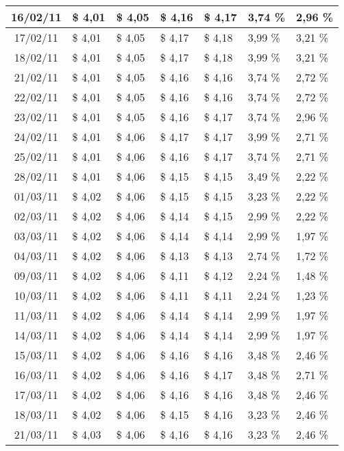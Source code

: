 \begin{center}
\begin{longtable}{|c|p{1.5cm}|p{1.5cm}|p{1.5cm}|p{1.5cm}|p{1.5cm}|p{1.5cm}|}
16/02/11 & \$ 4,01 & \$ 4,05 & \$ 4,16 & \$ 4,17 & 3,74 \% & 2,96 \% \\ \hline
17/02/11 & \$ 4,01 & \$ 4,05 & \$ 4,17 & \$ 4,18 & 3,99 \% & 3,21 \% \\ \hline
18/02/11 & \$ 4,01 & \$ 4,05 & \$ 4,17 & \$ 4,18 & 3,99 \% & 3,21 \% \\ \hline
21/02/11 & \$ 4,01 & \$ 4,05 & \$ 4,16 & \$ 4,16 & 3,74 \% & 2,72 \% \\ \hline
22/02/11 & \$ 4,01 & \$ 4,05 & \$ 4,16 & \$ 4,16 & 3,74 \% & 2,72 \% \\ \hline
23/02/11 & \$ 4,01 & \$ 4,05 & \$ 4,16 & \$ 4,17 & 3,74 \% & 2,96 \% \\ \hline
24/02/11 & \$ 4,01 & \$ 4,06 & \$ 4,17 & \$ 4,17 & 3,99 \% & 2,71 \% \\ \hline
25/02/11 & \$ 4,01 & \$ 4,06 & \$ 4,16 & \$ 4,17 & 3,74 \% & 2,71 \% \\ \hline
28/02/11 & \$ 4,01 & \$ 4,06 & \$ 4,15 & \$ 4,15 & 3,49 \% & 2,22 \% \\ \hline
01/03/11 & \$ 4,02 & \$ 4,06 & \$ 4,15 & \$ 4,15 & 3,23 \% & 2,22 \% \\ \hline
02/03/11 & \$ 4,02 & \$ 4,06 & \$ 4,14 & \$ 4,15 & 2,99 \% & 2,22 \% \\ \hline
03/03/11 & \$ 4,02 & \$ 4,06 & \$ 4,14 & \$ 4,14 & 2,99 \% & 1,97 \% \\ \hline
04/03/11 & \$ 4,02 & \$ 4,06 & \$ 4,13 & \$ 4,13 & 2,74 \% & 1,72 \% \\ \hline
09/03/11 & \$ 4,02 & \$ 4,06 & \$ 4,11 & \$ 4,12 & 2,24 \% & 1,48 \% \\ \hline
10/03/11 & \$ 4,02 & \$ 4,06 & \$ 4,11 & \$ 4,11 & 2,24 \% & 1,23 \% \\ \hline
11/03/11 & \$ 4,02 & \$ 4,06 & \$ 4,14 & \$ 4,14 & 2,99 \% & 1,97 \% \\ \hline
14/03/11 & \$ 4,02 & \$ 4,06 & \$ 4,14 & \$ 4,14 & 2,99 \% & 1,97 \% \\ \hline
15/03/11 & \$ 4,02 & \$ 4,06 & \$ 4,16 & \$ 4,16 & 3,48 \% & 2,46 \% \\ \hline
16/03/11 & \$ 4,02 & \$ 4,06 & \$ 4,16 & \$ 4,17 & 3,48 \% & 2,71 \% \\ \hline
17/03/11 & \$ 4,02 & \$ 4,06 & \$ 4,16 & \$ 4,16 & 3,48 \% & 2,46 \% \\ \hline
18/03/11 & \$ 4,02 & \$ 4,06 & \$ 4,15 & \$ 4,16 & 3,23 \% & 2,46 \% \\ \hline
21/03/11 & \$ 4,03 & \$ 4,06 & \$ 4,16 & \$ 4,16 & 3,23 \% & 2,46 \% \\ \hline

\end{longtable}
\end{center}
